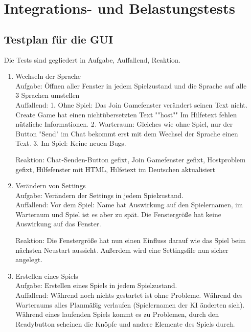 \documentclass[a4paper,10pt]{article}
\begin{document}
\section{Integrations- und Belastungstests}
\subsection{Testplan für die GUI}

Die Tests sind gegliedert in Aufgabe, Auffallend, Reaktion.
\begin{enumerate}
\item Wechseln der Sprache \\
Aufgabe: Öffnen aller Fenster in jedem Spielzustand und die Sprache auf alle 3 Sprachen umstellen\\

Auffallend:
1. Ohne Spiel: Das Join Gamefenster verändert seinen Text nicht. Create Game hat einen nichtübersetzten Text ""host"" Im Hilfetext fehlen nützliche Informationen.
2. Warteraum: Gleiches wie ohne Spiel, nur der Button "Send" im Chat bekommt erst mit dem Wechsel der Sprache einen Text.
3. Im Spiel: Keine neuen Bugs.

Reaktion:
Chat-Senden-Button gefixt, Join Gamefenster gefixt, Hostproblem gefixt, Hilfefenster mit HTML, Hilfetext im Deutschen aktualisiert

\item Verändern von Settings \\
Aufgabe: Verändern der Settings in jedem Spielzustand.\\

Auffallend: Vor dem Spiel: Name hat Auswirkung auf den Spielernamen, im Warteraum und Spiel ist es aber zu spät. Die Fenstergröße hat keine Auswirkung auf das Fenster.

Reaktion: Die Fenstergröße hat nun einen Einfluss darauf wie das Spiel beim nächsten Neustart aussieht. Außerdem wird eine Settingsfile nun sicher angelegt.

\item Erstellen eines Spiels \\
Aufgabe: Erstellen eines Spiels in jedem Spielzustand.\\

Auffallend: Während noch nichts gestartet ist ohne Probleme. Während des Warteraums alles Planmäßig verlaufen (Spielernamen der KI änderten sich). Während eines laufenden Spiels kommt es zu Problemen, durch den Readybutton scheinen die Knöpfe und andere Elemente des Spiels durch.


\end{enumerate}
\end{document}
